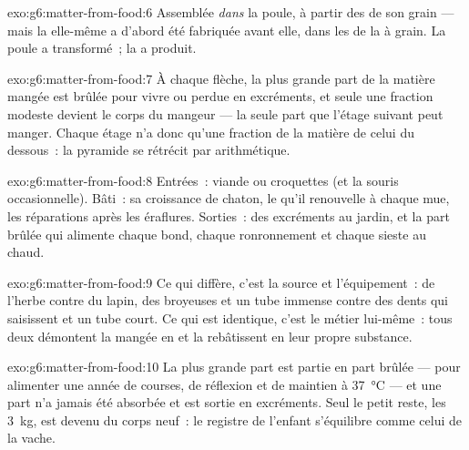 \begin{solution}{exo:g6:matter-from-food:6}
Assemblée \emph{dans} la poule, à partir des  de son grain
--- mais la  elle-même a d'abord été fabriquée
avant elle, dans les  de la  à grain. La poule a
transformé~; la  a produit.
\end{solution}

\begin{solution}{exo:g6:matter-from-food:7}
À chaque flèche, la plus grande part de la matière mangée est brûlée
pour vivre ou perdue en excréments, et seule une fraction modeste
devient le corps du mangeur --- la seule part que l'étage suivant
peut manger. Chaque étage n'a donc qu'une fraction de la matière de
celui du dessous~: la pyramide se rétrécit par arithmétique.
\end{solution}

\begin{solution}{exo:g6:matter-from-food:8}
Entrées~: viande ou croquettes (et la souris occasionnelle). Bâti~:
sa croissance de chaton, le  qu'il renouvelle à chaque mue,
les réparations après les éraflures. Sorties~: des excréments au
jardin, et la part brûlée qui alimente chaque bond, chaque
ronronnement et chaque sieste au chaud.
\end{solution}

\begin{solution}{exo:g6:matter-from-food:9}
Ce qui diffère, c'est la source et l'équipement~: de l'herbe contre
du lapin, des broyeuses et un tube immense contre des dents qui
saisissent et un tube court. Ce qui est identique, c'est le métier
lui-même~: tous deux démontent la  mangée en
 et la rebâtissent en leur propre substance.
\end{solution}

\begin{solution}{exo:g6:matter-from-food:10}
La plus grande part est partie en part brûlée --- pour alimenter une
année de courses, de réflexion et de maintien à
\qty{37}{\degreeCelsius} --- et une part n'a jamais été absorbée et
est sortie en excréments. Seul le petit reste, les \qty{3}{kg}, est
devenu du corps neuf~: le registre de l'enfant s'équilibre comme
celui de la vache.
\end{solution}

